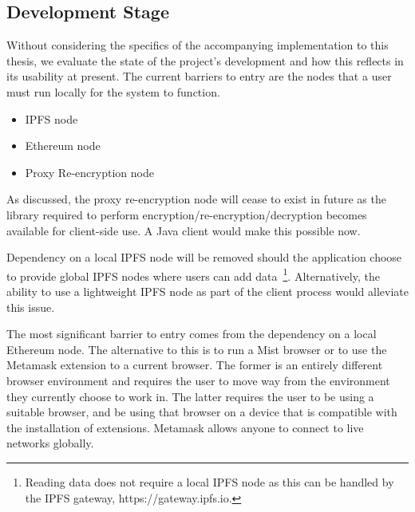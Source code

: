 \subsection{Development Stage}

Without considering the specifics of the accompanying implementation to this thesis, we evaluate the state of the project's development and how this reflects in its usability at present. The current barriers to entry are the nodes that a user must run locally for the system to function.

\begin{itemize}
  \item IPFS node
  \item Ethereum node
  \item Proxy Re-encryption node
\end{itemize}

As discussed, the proxy re-encryption node will cease to exist in future as the library required to perform encryption/re-encryption/decryption becomes available for client-side use. A Java client would make this possible now.

Dependency on a local IPFS node will be removed should the application choose to provide global IPFS nodes where users can add data~\footnote{Reading data does not require a local IPFS node as this can be handled by the IPFS gateway, https://gateway.ipfs.io.}. Alternatively, the ability to use a lightweight IPFS node as part of the client process would alleviate this issue.

The most significant barrier to entry comes from the dependency on a local Ethereum node. The alternative to this is to run a Mist browser or to use the Metamask extension to a current browser. The former is an entirely different browser environment and requires the user to move way from the environment they currently choose to work in. The latter requires the user to be using a suitable browser, and be using that browser on a device that is compatible with the installation of extensions. Metamask allows anyone to connect to live networks globally.

